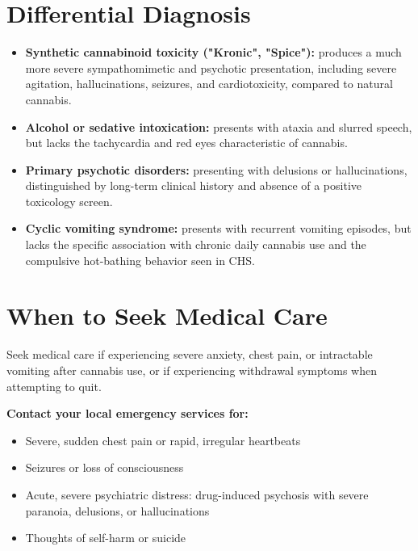 \section*{Differential Diagnosis}
\begin{itemize}
    \item \textbf{Synthetic cannabinoid toxicity ("Kronic", "Spice"):} produces a much more severe sympathomimetic and psychotic presentation, including severe agitation, hallucinations, seizures, and cardiotoxicity, compared to natural cannabis.
    \item \textbf{Alcohol or sedative intoxication:} presents with ataxia and slurred speech, but lacks the tachycardia and red eyes characteristic of cannabis.
    \item \textbf{Primary psychotic disorders:} presenting with delusions or hallucinations, distinguished by long-term clinical history and absence of a positive toxicology screen.
    \item \textbf{Cyclic vomiting syndrome:} presents with recurrent vomiting episodes, but lacks the specific association with chronic daily cannabis use and the compulsive hot-bathing behavior seen in CHS.
\end{itemize}

\section*{When to Seek Medical Care}
Seek medical care if experiencing severe anxiety, chest pain, or intractable vomiting after cannabis use, or if experiencing withdrawal symptoms when attempting to quit.

\textbf{Contact your local emergency services for:}
\begin{itemize}
    \item Severe, sudden chest pain or rapid, irregular heartbeats
    \item Seizures or loss of consciousness
    \item Acute, severe psychiatric distress: drug-induced psychosis with severe paranoia, delusions, or hallucinations
    \item Thoughts of self-harm or suicide
\end{itemize}

